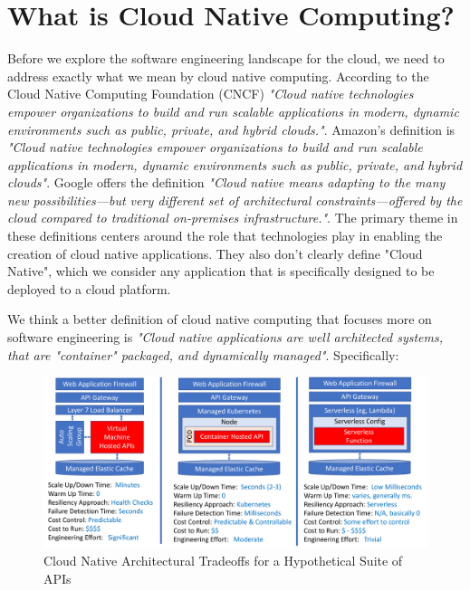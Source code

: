 \documentclass[conference]{IEEEconf}
\begin{document}
\section{What is Cloud Native Computing?}
\label{sec:WhatIsCNF}


Before we explore the software engineering landscape for the cloud, we need to address exactly what we mean by cloud native computing.  According to the Cloud Native Computing Foundation (CNCF)\cite{CNCFHome}  \textit{"Cloud native technologies empower organizations to build and run scalable applications in modern, dynamic environments such as public, private, and hybrid clouds."}.  Amazon's definition is \textit{"Cloud native technologies empower organizations to build and run scalable applications in modern, dynamic environments such as public, private, and hybrid clouds"}. Google offers the definition \textit{"Cloud native means adapting to the many new possibilities—but very different set of architectural constraints—offered by the cloud compared to traditional on-premises infrastructure."}.  The primary theme in these definitions centers around the role that technologies play in enabling the creation of cloud native applications.  They also don't clearly define "Cloud Native", which we consider any application that is specifically designed to be deployed to a cloud platform. 

We think a better definition of cloud native computing that focuses more on  software engineering is \textit{"Cloud native applications are well architected systems, that are "container" packaged, and dynamically managed"}. Specifically:

\begin{figure}[t]
	\includegraphics[width=\textwidth]{images/APIPackageTradoffs}	
	\caption{Cloud Native Architectural Tradeoffs for a Hypothetical Suite of APIs}
	\label{fig:CloudQATradeoffs}
\end{figure}
\end{document}
